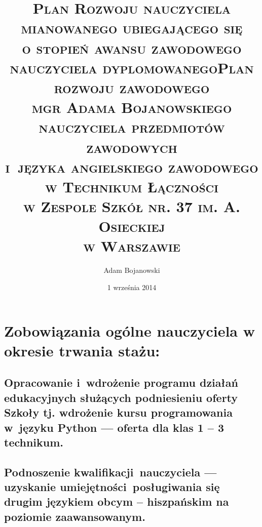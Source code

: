 \documentclass[a4paper,titlepage,13pt,draft]{mwart}
\title{\textsc{\huge{Plan Rozwoju nauczyciela mianowanego ubiegającego się\\
o stopień awansu zawodowego nauczyciela dyplomowanego}}}
\author{Adam Bojanowski}
\date{1 września 2014}
\begin{document}
\maketitle
%
\begin{center}
\title{\textsc{\Large{Plan rozwoju zawodowego\\mgr Adama Bojanowskiego\\nauczyciela przedmiotów zawodowych\\i~języka angielskiego zawodowego\\w Technikum Łączności\\w Zespole Szkół nr. 37 im. A. Osieckiej\\w Warszawie}}}

\end{center}
\section*{Zobowiązania ogólne nauczyciela w okresie trwania stażu:}
\subsection*{Opracowanie i~wdrożenie programu działań edukacyjnych służących podniesieniu oferty Szkoły tj. wdrożenie kursu programowania w~języku Python --- oferta dla klas 1 -- 3 technikum.}
\subsection*{Podnoszenie kwalifikacji~nauczyciela --- uzyskanie umiejętności~posługiwania się drugim językiem obcym -- hiszpańskim na poziomie zaawansowanym.}
\end{document}
